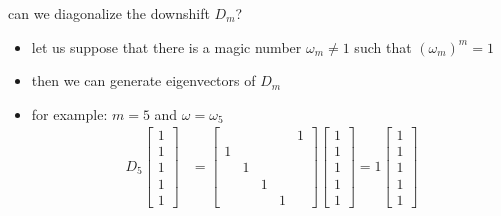\documentclass[10pt,
               svgnames,
               hyperref={colorlinks,citecolor=DeepPink4,linkcolor=FireBrick,urlcolor=Maroon},
               usepdftitle=false]{beamer}
\begin{document}
\begin{frame}{can we diagonalize the downshift $D_m$?}

\begin{itemize}
\item let us suppose that there is a magic number $\omega_m \ne 1$ such that $(\omega_m)^m = 1$
\item then we can generate eigenvectors of $D_m$
\item for example: $m=5$ and $\omega=\omega_5$
{\footnotesize
\begin{align*}
D_5 \begin{bmatrix} 1 \\ 1 \\ 1 \\ 1 \\ 1 \end{bmatrix} &= \begin{bmatrix} & & & & 1 \\ 1 & & & & \\ & 1 & & & \\ & & 1 & & \\ & & & 1 & \end{bmatrix} \begin{bmatrix} 1 \\ 1 \\ 1 \\ 1 \\ 1 \end{bmatrix} = 1 \begin{bmatrix} 1 \\ 1 \\ 1 \\ 1 \\ 1 \end{bmatrix}  \\

\end{align*}}
\end{itemize}
\end{frame}
\end{document}
